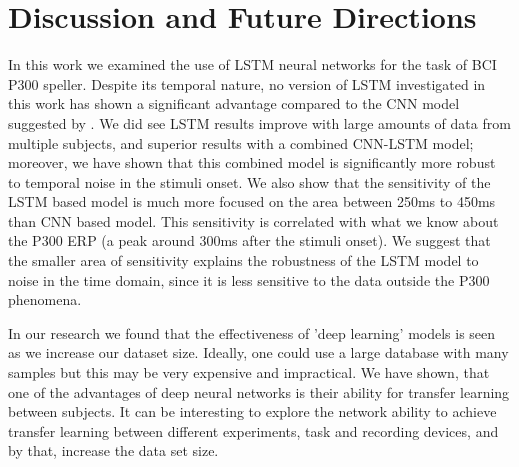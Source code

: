\documentclass[
12pt, %
english, %
doublespacing, %
headsepline, %
]{MastersDoctoralThesis} %
\begin{document}
\chapter{Discussion and Future Directions}
In this work we examined the use of LSTM neural networks for the task of BCI P300 speller. Despite its temporal nature, no version of LSTM investigated in this work has shown a significant advantage compared to the CNN model suggested by \cite{P300_CNN}. We did see LSTM results improve with large amounts of data from multiple subjects, and superior results with a combined CNN-LSTM model; moreover, we have shown that this combined model is significantly more robust to temporal noise in the stimuli onset. We also show that the sensitivity of the LSTM based model is much more focused on the area between 250ms to 450ms than CNN based model. This sensitivity is correlated with what we know about the P300 ERP (a peak around 300ms after the stimuli onset). We suggest that the smaller area of sensitivity explains the robustness of the LSTM model to noise in the time domain, since it is less sensitive to the data outside the P300 phenomena. 

In our research we found that the effectiveness of 'deep learning' models is seen as we increase our dataset size. Ideally, one could use a large database with many samples but this may be very expensive and impractical. We have shown, that one of the advantages of deep neural networks is their ability for transfer learning between subjects. It can be interesting to explore the network ability to achieve transfer learning between different experiments, task and recording devices, and by that, increase the data set size.  


\renewcommand{\bibsection}{\chapter{References}}





\end{document}
